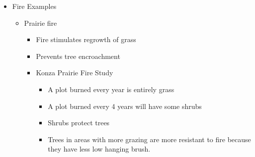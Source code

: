 \documentclass[12pt]{article}
\begin{document}
\begin{itemize}
    \item Fire Examples
    \begin{itemize}
        \item Prairie fire
        \begin{itemize}
            \item Fire stimulates regrowth of grass
            \item Prevents tree encroachment
            \item Konza Prairie Fire Study
            \begin{itemize}
                \item A plot burned every year is entirely grass
                \item A plot burned every 4 years will have some shrubs
                \item Shrubs protect trees
                \item Trees in areas with more grazing are more resistant to fire because they have less low hanging brush.
            \end{itemize} 
        \end{itemize} 
    \end{itemize} 
\end{itemize}
\end{document}
